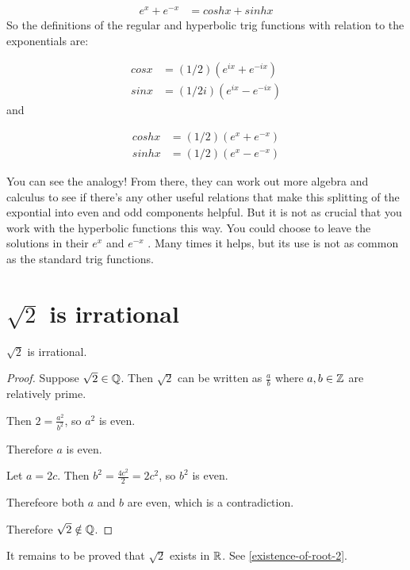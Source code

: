 \begin{align*}
e^x + e^{-x} &= cosh x + sinh x
\end{align*}
So the definitions of the regular and hyperbolic trig functions with relation to the exponentials
are:

\begin{align*}
cos x &= (1/2) ( e^{ix} + e^{-ix} ) \\
sin x &= (1/2i) ( e^{ix} - e^{-ix} )
\end{align*}
and

\begin{align*}
cosh x &= (1/2) ( e^x + e^{-x} ) \\
sinh x &= (1/2) ( e^x - e^{-x} )
\end{align*}

You can see the analogy! From there, they can work out more algebra and calculus to see if there's
any other useful relations that make this splitting of the expontial into even and odd components
helpful. But it is not as crucial that you work with the hyperbolic functions this way. You could
choose to leave the solutions in their $e^{x}$ and $e^{-x}$ . Many times it helps, but its use is
not as common as the standard trig functions.



\section{$\sqrt{2}$ is irrational}
\begin{theorem*}
  $\sqrt{2}$ is irrational.
\end{theorem*}

\begin{proof}
  Suppose $\sqrt{2} \in \mathbb{Q}$. Then $\sqrt{2}$ can be written as $\frac{a}{b}$ where $a, b \in \mathbb{Z}$ are relatively prime.

  Then $2 = \frac{a^2}{b^2}$, so $a^2$ is even.

  Therefore $a$ is even.

  Let $a = 2c$. Then $b^2 = \frac{4c^2}{2} = 2c^2$, so $b^2$ is even.

  Therefeore both $a$ and $b$ are even, which is a contradiction.

  Therefore $\sqrt{2} \notin \mathbb{Q}$.
\end{proof}

\begin{remark*}
  It remains to be proved that $\sqrt{2}$ exists in $\mathbb{R}$. See \ref{existence-of-root-2}.
\end{remark*}

